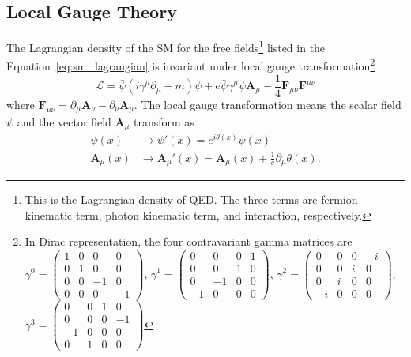 \subsection{Local Gauge Theory}
\label{subsec:sm_gauge_theory}
The Lagrangian density of the SM for the free fields\footnote{This is the Lagrangian density of QED. The three terms are fermion kinematic term, photon kinematic term, and interaction, respectively.} listed in the Equation~\ref{eq:sm_lagrangian} is invariant under local gauge transformation\footnote{In Dirac representation, the four contravariant gamma matrices are $\gamma^{0} = \left(\begin{matrix}1 & 0 & 0 & 0\\0 & 1 & 0 & 0\\0 & 0 & -1 & 0\\0 & 0 & 0 & -1\end{matrix}\right)$, $\gamma^{1} = \left(\begin{matrix}0 & 0 & 0 & 1\\0 & 0 & 1 & 0\\0 & -1 & 0 & 0\\-1 & 0 & 0 & 0\end{matrix}\right)$, $\gamma^{2} = \left(\begin{matrix}0 & 0 & 0 & -i\\0 & 0 & i & 0\\0 & i & 0 & 0\\-i & 0 & 0 & 0\end{matrix}\right)$, $\gamma^{3} = \left(\begin{matrix}0 & 0 & 1 & 0\\0 & 0 & 0 & -1\\-1 & 0 & 0 & 0\\0 & 1 & 0 & 0\end{matrix}\right)$}
%
\begin{equation}
    \mathcal{L} = \bar{\psi}(i\gamma^{\mu}\partial_{\mu} - m)\psi + e\bar{\psi}\gamma^{\mu}\psi\bm{A}_{\mu} - \frac{1}{4}\bm{F}_{\mu\nu}\bm{F}^{\mu\nu}
    \label{eq:sm_lagrangian}
\end{equation}
%
where $\bm{F}_{\mu\nu} = \partial_{\mu}\bm{A}_{\nu} - \partial_{\nu}\bm{A}_{\mu}$.
The local gauge transformation means the scalar field $\psi$ and the vector field $\bm{A}_{\mu}$ transform as
%
\begin{align}
    \psi(x) & \rightarrow \psi'(x) = e^{i\theta(x)}\psi(x)\\
    \bm{A}_{\mu}(x) & \rightarrow \bm{A}_{\mu}'(x) = \bm{A}_{\mu}(x) + \frac{1}{e}\partial_{\mu}\theta(x).
    \label{eq:sm_gauge_transformation}
\end{align}
